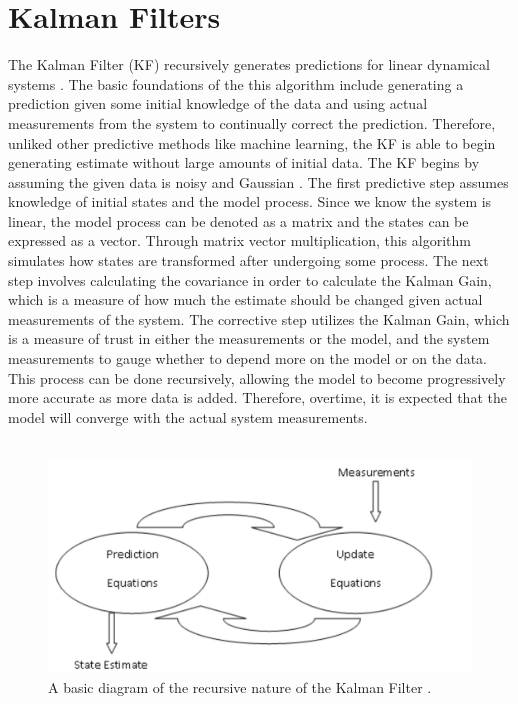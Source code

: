 \chapter{Kalman Filters}
\label{Kalman Filters}



The Kalman Filter (KF) recursively generates predictions for linear dynamical systems \cite{inbook}. The basic foundations of the this algorithm include generating a prediction given some initial knowledge of the data and using actual measurements from the system to continually correct the prediction. Therefore,  unliked other predictive methods like machine learning, the KF is able to begin generating estimate without large amounts of initial data. The KF begins by assuming the given data is noisy and Gaussian \cite{inproceedings, article7}. The first predictive step assumes knowledge of initial states and the model process. Since we know the system is linear, the model process can be denoted as a matrix and the states can be expressed as a vector. Through matrix vector  multiplication, this algorithm simulates how states are transformed after undergoing some process. The next step involves calculating the covariance in order to calculate the Kalman Gain, which is a measure of how much the estimate should be changed given actual measurements of the system. The corrective step utilizes the Kalman Gain, which is a measure of trust in either the measurements or the model, and the system measurements to gauge whether to depend more on the model or on the data. This process can be done recursively, allowing the model to become progressively more accurate as more data is added. Therefore, overtime, it is expected that the model will converge with the actual system measurements.
\\  \\

\begin{figure}[h]
    \centering
    \includegraphics[scale = 0.3]{diagram.png}
    \caption{A basic diagram of the recursive nature of the Kalman Filter \cite{kohanbash_2014}.}
\end{figure}
\newpage


